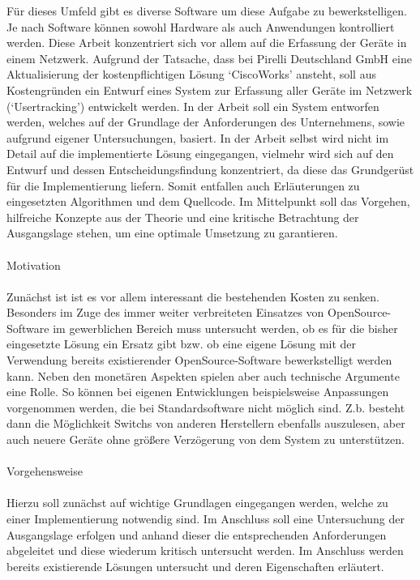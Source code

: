 Für dieses Umfeld gibt es diverse Software um diese Aufgabe zu bewerkstelligen.
Je nach Software können sowohl Hardware als auch Anwendungen kontrolliert werden.
Diese Arbeit konzentriert sich vor allem auf die Erfassung der Geräte in einem Netzwerk.
Aufgrund der Tatsache, dass bei Pirelli Deutschland GmbH eine Aktualisierung der kostenpflichtigen Lösung ‘CiscoWorks’ ansteht, soll aus Kostengründen ein Entwurf eines System zur Erfassung aller Geräte im Netzwerk (‘Usertracking’) entwickelt werden.
In der Arbeit soll ein System entworfen werden, welches auf der Grundlage der Anforderungen des Unternehmens, sowie aufgrund eigener Untersuchungen, basiert.
In der Arbeit selbst wird nicht im Detail auf die implementierte Lösung eingegangen, vielmehr wird sich auf den Entwurf und dessen Entscheidungsfindung konzentriert, da diese das Grundgerüst für die Implementierung liefern.
Somit entfallen auch Erläuterungen zu eingesetzten Algorithmen und dem Quellcode.
Im Mittelpunkt soll das Vorgehen, hilfreiche Konzepte aus der Theorie und eine kritische Betrachtung der Ausgangslage stehen, um eine optimale Umsetzung zu garantieren.\\
\\
Motivation\\
\\
Zunächst ist ist es vor allem interessant die bestehenden Kosten zu senken.
Besonders im Zuge des immer weiter verbreiteten Einsatzes von OpenSource-Software im gewerblichen Bereich muss untersucht werden, ob es für die bisher eingesetzte Lösung ein Ersatz gibt bzw. ob eine eigene Lösung mit der Verwendung bereits existierender OpenSource-Software bewerkstelligt werden kann.
Neben den monetären Aspekten spielen aber auch technische Argumente eine Rolle.
So können bei eigenen Entwicklungen beispielsweise Anpassungen vorgenommen werden, die bei Standardsoftware nicht möglich sind.
Z.b. besteht dann die Möglichkeit Switchs von anderen Herstellern ebenfalls auszulesen, aber auch neuere Geräte ohne größere Verzögerung von dem System zu unterstützen.
\\
\\Vorgehensweise\\
\\
Hierzu soll zunächst auf wichtige Grundlagen eingegangen werden, welche zu einer Implementierung notwendig sind.
Im Anschluss soll eine Untersuchung der Ausgangslage erfolgen und anhand dieser die entsprechenden Anforderungen abgeleitet und diese wiederum kritisch untersucht werden.
Im Anschluss werden bereits existierende Lösungen untersucht und deren Eigenschaften erläutert.
